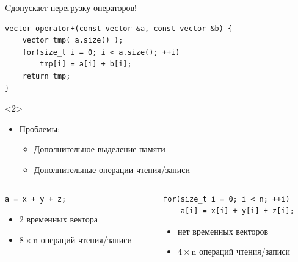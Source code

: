 \documentclass[@BEAMER_OPTIONS@]{beamer}
\newcommand{\CXX}{{\rm C}\plusplus}
\begin{document}
\begin{frame}[fragile]{\CXX допускает перегрузку операторов!}
    \begin{exampleblock}{}
        \begin{lstlisting}
vector operator+(const vector &a, const vector &b) {
    vector tmp( a.size() );
    for(size_t i = 0; i < a.size(); ++i)
        tmp[i] = a[i] + b[i];
    return tmp;
}
        \end{lstlisting}
    \end{exampleblock}
    \begin{uncoverenv}<2>
        \begin{itemize}
            \item Проблемы:
                \begin{itemize}
                    \item Дополнительное выделение памяти
                    \item Дополнительные операции чтения/записи
                \end{itemize}
        \end{itemize}
        \begin{columns}
            \begin{column}{0.45\textwidth}
                \begin{exampleblock}{}
                    \begin{lstlisting}[aboveskip=0.4\baselineskip,belowskip=0.4\baselineskip]
a = x + y + z;

                    \end{lstlisting}
                \end{exampleblock}
                \begin{itemize}
                    \item 2 временных вектора
                    \item $8 \times \text{n}$ операций чтения/записи
                \end{itemize}
            \end{column}
            \begin{column}{0.45\textwidth}
                \begin{exampleblock}{}
                    \begin{lstlisting}
for(size_t i = 0; i < n; ++i)
    a[i] = x[i] + y[i] + z[i];
                    \end{lstlisting}
                \end{exampleblock}
                \begin{itemize}
                    \item нет временных векторов
                    \item $4 \times \text{n}$ операций чтения/записи
                \end{itemize}
            \end{column}
        \end{columns}
    \end{uncoverenv}
\end{frame}
\end{document}
